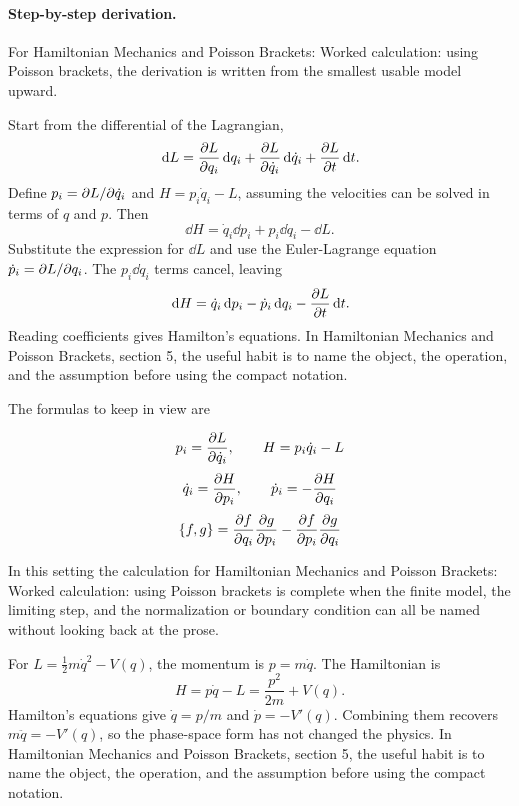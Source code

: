 \paragraph{Step-by-step derivation.}

For Hamiltonian Mechanics and Poisson Brackets: Worked calculation: using Poisson brackets, the derivation is written from the smallest usable model upward.

Start from the differential of the Lagrangian,
\[
  \,\mathrm d L=\frac{\partial L}{\partial q_i}\,\mathrm d q_i+\frac{\partial L}{\partial\dot q_i}\,\mathrm d\dot q_i+\frac{\partial L}{\partial t}\,\mathrm d t.
\]
Define \(p_i=\partial L/\partial\dot q_i\) and \(H=p_i\dot q_i-L\), assuming the velocities can be solved in terms of \(q\) and \(p\).  Then
\[
  \dd H=\dot q_i\dd p_i+p_i\dd\dot q_i-\dd L.
\]
Substitute the expression for \(\dd L\) and use the Euler-Lagrange equation \(\dot p_i=\partial L/\partial q_i\).  The \(p_i\dd\dot q_i\) terms cancel, leaving
\[
  \,\mathrm d H=\dot q_i\,\mathrm d p_i-\dot p_i\,\mathrm d q_i-\frac{\partial L}{\partial t}\,\mathrm d t.
\]
Reading coefficients gives Hamilton's equations.  In Hamiltonian Mechanics and Poisson Brackets, section 5, the useful habit is to name the object, the operation, and the assumption before using the compact notation.

The formulas to keep in view are

\[
  p_i=\frac{\partial L}{\partial\dot q_i},\qquad H=p_i\dot q_i-L
\]
\[
  \dot q_i=\frac{\partial H}{\partial p_i},\qquad \dot p_i=-\frac{\partial H}{\partial q_i}
\]
\[
  \{f,g\}=\frac{\partial f}{\partial q_i}\frac{\partial g}{\partial p_i}-\frac{\partial f}{\partial p_i}\frac{\partial g}{\partial q_i}
\]

In this setting the calculation for Hamiltonian Mechanics and Poisson Brackets: Worked calculation: using Poisson brackets is complete when the finite model, the limiting step, and the normalization or boundary condition can all be named without looking back at the prose.




\begin{example}
For \(L=\frac12m\dot q^2-V(q)\), the momentum is \(p=m\dot q\).  The Hamiltonian is
\[
  H=p\dot q-L=\frac{p^2}{2m}+V(q).
\]
Hamilton's equations give \(\dot q=p/m\) and \(\dot p=-V'(q)\).  Combining them recovers \(m\ddot q=-V'(q)\), so the phase-space form has not changed the physics.  In Hamiltonian Mechanics and Poisson Brackets, section 5, the useful habit is to name the object, the operation, and the assumption before using the compact notation.
\end{example}



